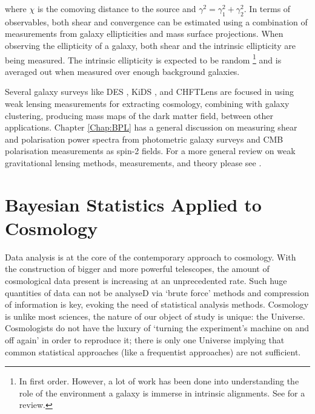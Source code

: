 where $\chi$ is the comoving distance to the source and $\gamma^2 = \gamma_1^2 + \gamma_2^2$. In terms of observables, both shear and convergence can be estimated using a combination of measurements from galaxy ellipticities and mass surface projections. When observing the ellipticity of a galaxy, both shear and the intrinsic ellipticity are being measured. The intrinsic ellipticity is expected to be random \footnote{In first order. However, a lot of work has been done into understanding the role of the environment a galaxy is immerse in intrinsic alignments. See \cite{2015Kirk_IA} for a review.} and is averaged out when measured over enough background galaxies. 

\qquad Several galaxy surveys like DES \citep{2017arXiv170801530D}, KiDS \citep{2017MNRAS.465.1454H}, and CHFTLens \citep{2014CHFTLens} are focused in using weak lensing measurements for extracting cosmology, combining with galaxy clustering, producing mass maps of the dark matter field, between other applications. Chapter \ref{Chap:BPL} has a general discussion on measuring shear and polarisation power spectra from photometric galaxy surveys and CMB polarisation measurements as spin-2 fields. For a more general review on weak gravitational lensing methods, measurements, and theory please see \cite{2005astro.ph..9252S,2017SchpJ..1232440B}.


\section{Bayesian Statistics Applied to Cosmology}\label{sec:intro:motivation}
Data analysis is at the core of the contemporary approach to cosmology. With the construction of bigger and more powerful telescopes, the amount of cosmological data present is increasing at an unprecedented rate. Such huge quantities of data can not be analyseD via `brute force' methods and compression of information is key, evoking the need of statistical analysis methods. Cosmology is unlike most sciences, the nature of our object of study is unique: the Universe. Cosmologists do not have the luxury of `turning the experiment's machine on and off again' in order to reproduce it; there is only one Universe implying that common statistical approaches (like a frequentist approaches) are not sufficient.

